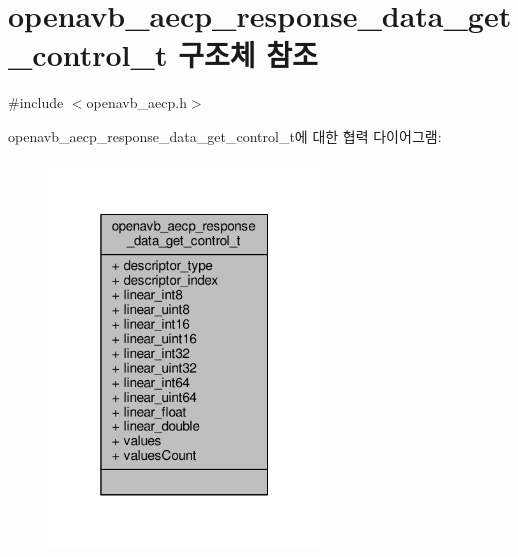 \hypertarget{structopenavb__aecp__response__data__get__control__t}{}\section{openavb\+\_\+aecp\+\_\+response\+\_\+data\+\_\+get\+\_\+control\+\_\+t 구조체 참조}
\label{structopenavb__aecp__response__data__get__control__t}


{\ttfamily \#include $<$openavb\+\_\+aecp.\+h$>$}



openavb\+\_\+aecp\+\_\+response\+\_\+data\+\_\+get\+\_\+control\+\_\+t에 대한 협력 다이어그램\+:
\nopagebreak
\begin{figure}[H]
\begin{center}
\leavevmode
\includegraphics[width=205pt]{structopenavb__aecp__response__data__get__control__t__coll__graph}
\end{center}
\end{figure}
